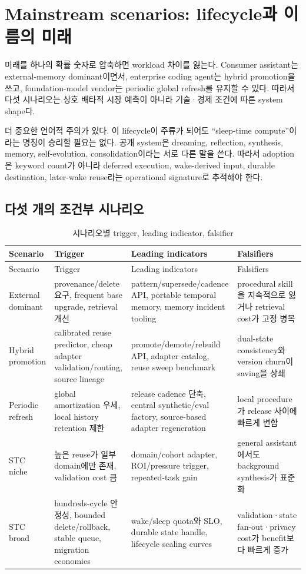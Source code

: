 \chapter{Mainstream scenarios: lifecycle과 이름의 미래}
\label{STC-S11}

미래를 하나의 확률 숫자로 압축하면 workload 차이를 잃는다. Consumer assistant는 external-memory
dominant이면서, enterprise coding agent는 hybrid promotion을 쓰고, foundation-model vendor는
periodic global refresh를 유지할 수 있다. 따라서 다섯 시나리오는 상호 배타적 시장 예측이 아니라
기술·경제 조건에 따른 system shape다.

더 중요한 언어적 주의가 있다. 이 lifecycle이 주류가 되어도 ``sleep-time compute''이라는 명칭이
승리할 필요는 없다. 공개 system은 dreaming, reflection, synthesis, memory, self-evolution,
consolidation이라는 서로 다른 말을 쓴다.
\autocite{srcstc0052,srcstc0054,srcstc0060,srcstc0063} 따라서 adoption은 keyword count가 아니라
deferred execution, wake-derived input, durable destination, later-wake reuse라는 operational signature로
추적해야 한다.

\section{다섯 개의 조건부 시나리오}

\begin{longtable}{L{0.15\textwidth} L{0.23\textwidth} L{0.25\textwidth} L{0.22\textwidth}}
\caption{시나리오별 trigger, leading indicator, falsifier}\label{tab:mainstream-scenarios}\\
\toprule
Scenario & Trigger & Leading indicators & Falsifiers \\
\midrule
\endfirsthead
\toprule
Scenario & Trigger & Leading indicators & Falsifiers \\
\midrule
\endhead
External dominant & provenance/delete 요구, frequent base upgrade, retrieval 개선 & pattern/supersede/cadence API, portable temporal memory, memory incident tooling & procedural skill을 지속적으로 잃거나 retrieval cost가 고정 병목 \\
Hybrid promotion & calibrated reuse predictor, cheap adapter validation/routing, source lineage & promote/demote/rebuild API, adapter catalog, reuse sweep benchmark & dual-state consistency와 version churn이 saving을 상쇄 \\
Periodic refresh & global amortization 우세, local history retention 제한 & release cadence 단축, central synthetic/eval factory, source-based adapter regeneration & local procedure가 release 사이에 빠르게 변함 \\
STC niche & 높은 reuse가 일부 domain에만 존재, validation cost 큼 & domain/cohort adapter, ROI/pressure trigger, repeated-task gain & general assistant에서도 background synthesis가 표준화 \\
STC broad & hundreds-cycle 안정성, bounded delete/rollback, stable queue, migration economics & wake/sleep quota와 SLO, durable state handle, lifecycle scaling curves & validation·state fan-out·privacy cost가 benefit보다 빠르게 증가 \\
\bottomrule
\end{longtable}

